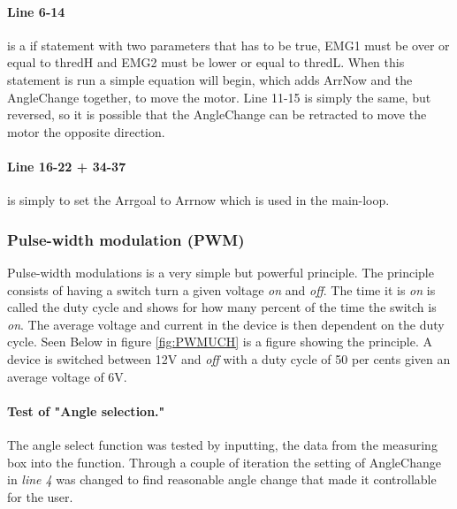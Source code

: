 \paragraph{Line 6-14}is a if statement with two parameters that has to be true, EMG1 must be over or equal to thredH and EMG2 must be lower or equal to thredL. When this statement is run a simple equation will begin, which adds ArrNow and the AngleChange together, to move the motor. Line 11-15 is simply the same, but reversed, so it is possible that the AngleChange can be retracted to move the motor the opposite direction. 
\paragraph{Line 16-22 + 34-37} is simply to set the Arrgoal to Arrnow which is used in the main-loop.

\subsubsection*{Pulse-width modulation (PWM)}
Pulse-width modulations is a very simple but powerful principle. The principle consists of having a switch turn a given voltage \textit{on} and \textit{off}. The time it is \textit{on} is called the duty cycle and shows for how many percent of the time the switch is \textit{on}.  The average voltage and current in the device is then dependent on the duty cycle. Seen Below in figure \ref{fig:PWMUCH} is a figure showing the principle. A device is switched between 12V and \textit{off} with a duty cycle of 50 per cents given an average voltage of 6V.

\paragraph{Test of "Angle selection."}
The angle select function was tested by inputting, the data from the measuring box into the function.  Through a couple of iteration the setting of AngleChange in \textit{line 4} was changed to find reasonable angle change that made it controllable for the user. 
